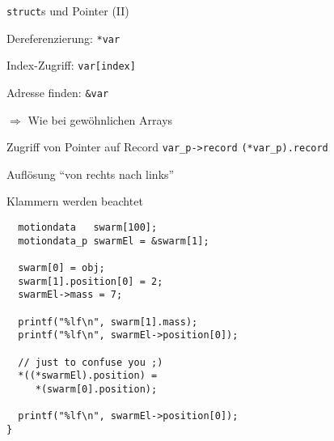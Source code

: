 \begin{frame}[fragile]{\texttt{struct}s und Pointer (II)}
%
%
\begin{itembox}[Array von structs, equal height group=GStrPtrII]
\item Dereferenzierung: 
	\tabto{3cm}
	\texttt{*var}
\item Index-Zugriff: 
	\tabto{3cm}
	\texttt{var[index]}
\item Adresse finden: 
	\tabto{3cm}
	\texttt{\&var}
\item[$\Rightarrow$] Wie bei gewöhnlichen Arrays
\item Zugriff von Pointer auf Record\newline
	\texttt{var\_p->record}\newline
	\texttt{(*var\_p).record}
\item Auflösung \enquote{von rechts nach links}
\item Klammern werden beachtet
\end{itembox}
%
\begin{codebox}[Code, equal height group=GStrPtrII]
\begin{verbatim}
  motiondata   swarm[100];
  motiondata_p swarmEl = &swarm[1];

  swarm[0] = obj;
  swarm[1].position[0] = 2;
  swarmEl->mass = 7;

  printf("%lf\n", swarm[1].mass);
  printf("%lf\n", swarmEl->position[0]);

  // just to confuse you ;)
  *((*swarmEl).position) = 
     *(swarm[0].position);

  printf("%lf\n", swarmEl->position[0]);
}
\end{verbatim}
\end{codebox}
%
\end{frame}


